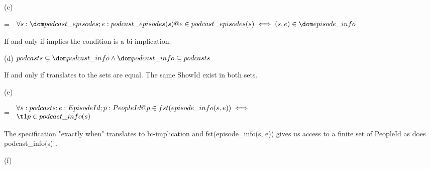 \documentclass[a4paper,10pt,fleqn]{article}
\begin{document}
\noindent\hspace*{\parindent}(c)

\setlength{\leftskip}{\dimexpr\parindent+2em\relax}
\savedleftskip=\leftskip
\noindent
$\displaystyle
\begin{array}{l}
\forall s : \dom podcast\_episodes; e : podcast\_episodes(s) @ e \in podcast\_episodes(s) \iff (s, e) \in \dom episode\_info
\end{array}$

\bigskip


\bigskip

\setlength{\leftskip}{\dimexpr\parindent+2em\relax}
\noindent If and only if implies the condition is a bi-implication.

\bigskip

\newpage

\setlength{\leftskip}{0pt}
\medskip

\noindent\hspace*{\parindent}(d) $podcasts \subseteq \dom podcast\_info \land \dom podcast\_info \subseteq podcasts$

\bigskip

\setlength{\leftskip}{\dimexpr\parindent+2em\relax}
\noindent If and only if translates to the sets are equal. The same ShowId exist in both sets.

\bigskip

\setlength{\leftskip}{0pt}
\medskip

\noindent\hspace*{\parindent}(e)

\setlength{\leftskip}{\dimexpr\parindent+2em\relax}
\savedleftskip=\leftskip
\noindent
$\displaystyle
\begin{array}{l}
\forall s : podcasts; e : EpisodeId; p : PeopleId @ p \in fst(episode\_info(s, e)) \iff \\
\t1 p \in podcast\_info(s)
\end{array}$

\bigskip


\bigskip

\setlength{\leftskip}{\dimexpr\parindent+2em\relax}
\noindent The specification "exactly when" translates to bi-implication and fst(episode\_info(s, e)) gives us access to a finite set of PeopleId as does podcast\_info(s) .

\bigskip

\setlength{\leftskip}{0pt}
\medskip

\noindent\hspace*{\parindent}(f)
\end{document}
